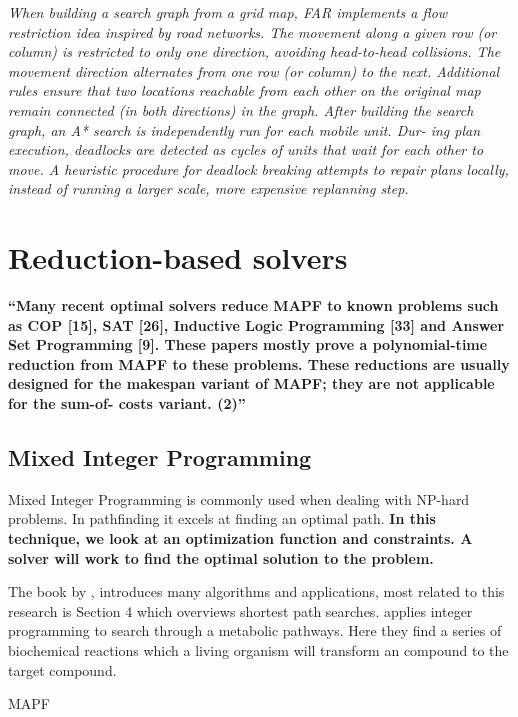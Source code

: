 \documentclass[a4paper,11pt]{article}
\begin{document}
\textit{When building a search graph from a grid map, FAR implements a flow restriction idea inspired by road networks. The movement along a given row (or column) is restricted to only one direction, avoiding head-to-head collisions. The movement direction alternates from one row (or column) to the next. Additional rules ensure that two locations reachable from each other on the original map remain connected (in both directions) in the graph. After building the search graph, an A* search is independently run for each mobile unit. Dur- ing plan execution, deadlocks are detected as cycles of units that wait for each other to move. A heuristic procedure for deadlock breaking attempts to repair plans locally, instead of running a larger scale, more expensive replanning step.}




\section{Reduction-based solvers}

\textbf{\cite{surynek2016efficient} ``Many recent optimal solvers reduce MAPF to known problems such as COP [15], SAT [26], Inductive Logic Programming [33] and Answer Set Programming [9]. These papers mostly prove a polynomial-time reduction from MAPF to these problems. These reductions are usually designed for the makespan variant of MAPF; they are not applicable for the sum-of- costs variant.
(2)''}

\subsection{Mixed Integer Programming}
Mixed Integer Programming is commonly used when dealing with NP-hard problems. In pathfinding it excels at finding an optimal path. \textbf{In this technique, we look at an optimization function and constraints. A solver will work to find the optimal solution to the problem.}

The book by \cite{ahuja1993network}, introduces many algorithms and applications, most related to this research is Section 4 which overviews shortest path searches. \cite{planes2009path} applies integer programming to search through a metabolic pathways. Here they find a series of biochemical reactions which a living organism will transform an compound to the target compound.

MAPF
\end{document}
